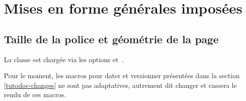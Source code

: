 \documentclass{tutodoc}
\begin{document}
\section{Mises en forme générales imposées}

\subsection{Taille de la police et géométrie de la page}

La classe  est chargée via les options  et \,.


\begin{tdocwarn}
	Pour le moment, les macros pour dater et versionner présentées dans la section  \ref{tutodoc-changes} ne sont pas adaptatives, autrement dit changer  et  cassera le rendu de ces macros.
\end{tdocwarn}
\end{document}
